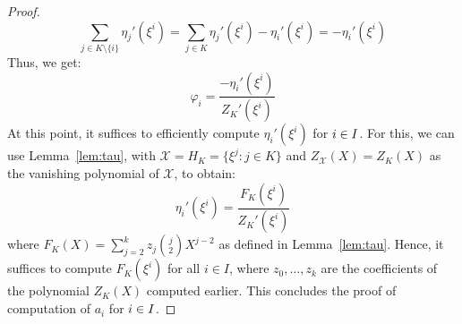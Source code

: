 \begin{proof}
    $$\sum_{j\in K\setminus \{i\}}\eta_j'(\xi^i)= \sum_{j\in K}\eta_j'(\xi^i)-\eta_i'(\xi^i)=-\eta_i'(\xi^i)$$
	Thus, we get:
    $$\varphi_i = \frac{-\eta_i'(\xi^i)}{Z_K'(\xi^i)}$$
    At this point, it suffices to efficiently compute $\eta_i'(\xi^i)$ for $i\in I$. For this, we can use Lemma~\ref{lem:tau}, with $\mathcal{X} = H_K = \{\xi^j: j\in K\}$ and $Z_{\mathcal{X}}(X)=Z_K(X)$ as the vanishing polynomial of $\mathcal{X}$, to obtain:
%
    $$\eta_i'(\xi^i)=\frac{F_K(\xi^i)}{Z_K'(\xi^i)}$$
    where $F_K(X)=\sum_{j=2}^k z_j\binom{j}{2}X^{j-2}$ as defined in Lemma~\ref{lem:tau}. Hence, it suffices to compute $F_K(\xi^i)$ for all $i \in I$, where $z_0,\ldots,z_k$ are the coefficients of the polynomial $Z_K(X)$ computed earlier. This concludes the proof of computation of $a_i$ for $i\in I$. 

%


	
	\smallskip
	

\end{proof}
